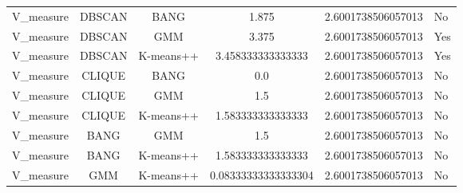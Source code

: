 \begin{table}[ht]
\begin{tabular}{cccc}
V_measure & DBSCAN & BANG & 1.875 & 2.6001738506057013 & No\\
V_measure & DBSCAN & GMM & 3.375 & 2.6001738506057013 & Yes\\
V_measure & DBSCAN & K-means++ & 3.458333333333333 & 2.6001738506057013 & Yes\\
V_measure & CLIQUE & BANG & 0.0 & 2.6001738506057013 & No\\
V_measure & CLIQUE & GMM & 1.5 & 2.6001738506057013 & No\\
V_measure & CLIQUE & K-means++ & 1.583333333333333 & 2.6001738506057013 & No\\
V_measure & BANG & GMM & 1.5 & 2.6001738506057013 & No\\
V_measure & BANG & K-means++ & 1.583333333333333 & 2.6001738506057013 & No\\
V_measure & GMM & K-means++ & 0.08333333333333304 & 2.6001738506057013 & No\\

\bottomrule
\end{tabular}
\end{table}
